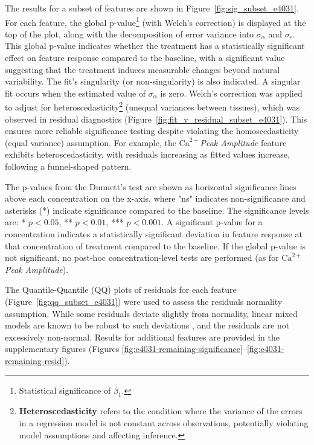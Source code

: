 \documentclass{report}
\begin{document}
            The results for a subset of features are shown in Figure~\ref{fig:sig_subset_e4031}. For each feature, the global p-value\footnote{Statistical significance of \(\beta_1\).} (with Welch's correction) is displayed at the top of the plot, along with the decomposition of error variance into \(\sigma_\alpha\) and \(\sigma_\epsilon\). This global p-value indicates whether the treatment has a statistically significant effect on feature response compared to the baseline, with a significant value suggesting that the treatment induces measurable changes beyond natural variability. The fit's singularity (or non-singularity) is also indicated. A singular fit occurs when the estimated value of \(\sigma_\alpha\) is zero. Welch's correction \cite{WikipediaWelchSatterthwaite} was applied to adjust for heteroscedasticity\footnote{\textbf{Heteroscedasticity} refers to the condition where the variance of the errors in a regression model is not constant across observations, potentially violating model assumptions and affecting inference.} (unequal variances between tissues), which was observed in residual diagnostics (Figure~\ref{fig:fit_v_residual_subset_e4031}). This ensures more reliable significance testing despite violating the homoscedasticity (equal variance) assumption. For example, the \textit{\(\text{Ca}^{2+}\)Peak Amplitude} feature exhibits heteroscedasticity, with residuals increasing as fitted values increase, following a funnel-shaped pattern.
            
            The p-values from the Dunnett's test are shown as horizontal significance lines above each concentration on the x-axis, where "ns" indicates non-significance and asterisks (*) indicate significance compared to the baseline. The significance levels are: * \(p < 0.05\), ** \(p < 0.01\), *** \(p < 0.001\). A significant p-value for a concentration indicates a statistically significant deviation in feature response at that concentration of treatment compared to the baseline. If the global p-value is not significant, no post-hoc concentration-level tests are performed (as for \textit{\(\text{Ca}^{2+}\)Peak Amplitude}).
            
            The Quantile-Quantile (QQ) plots of residuals for each feature (Figure~\ref{fig:qq_subset_e4031}) were used to assess the residuals normality assumption. While some residuals deviate slightly from normality, linear mixed models are known to be robust to such deviations \cite{jacqmingadda:inserm-00084214}, and the residuals are not excessively non-normal. Results for additional features are provided in the supplementary figures (Figures \ref{fig:e4031-remaining-significance}--\ref{fig:e4031-remaining-resid}).
            
\end{document}
